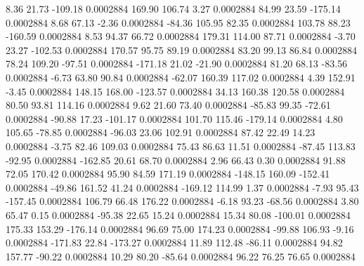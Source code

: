         8.36       21.73     -109.18     0.0002884
      169.90      106.74        3.27     0.0002884
       84.99       23.59     -175.14     0.0002884
        8.68       67.13       -2.36     0.0002884
      -84.36      105.95       82.35     0.0002884
      103.78       88.23     -160.59     0.0002884
        8.53       94.37       66.72     0.0002884
      179.31      114.00       87.71     0.0002884
       -3.70       23.27     -102.53     0.0002884
      170.57       95.75       89.19     0.0002884
       83.20       99.13       86.84     0.0002884
       78.24      109.20      -97.51     0.0002884
     -171.18       21.02      -21.90     0.0002884
       81.20       68.13      -83.56     0.0002884
       -6.73       63.80       90.84     0.0002884
      -62.07      160.39      117.02     0.0002884
        4.39      152.91       -3.45     0.0002884
      148.15      168.00     -123.57     0.0002884
       34.13      160.38      120.58     0.0002884
       80.50       93.81      114.16     0.0002884
        9.62       21.60       73.40     0.0002884
      -85.83       99.35      -72.61     0.0002884
      -90.88       17.23     -101.17     0.0002884
      101.70      115.46     -179.14     0.0002884
        4.80      105.65      -78.85     0.0002884
      -96.03       23.06      102.91     0.0002884
       87.42       22.49       14.23     0.0002884
       -3.75       82.46      109.03     0.0002884
       75.43       86.63       11.51     0.0002884
      -87.45      113.83      -92.95     0.0002884
     -162.85       20.61       68.70     0.0002884
        2.96       66.43        0.30     0.0002884
       91.88       72.05      170.42     0.0002884
       95.90       84.59      171.19     0.0002884
     -148.15      160.09     -152.41     0.0002884
      -49.86      161.52       41.24     0.0002884
     -169.12      114.99        1.37     0.0002884
       -7.93       95.43     -157.45     0.0002884
      106.79       66.48      176.22     0.0002884
       -6.18       93.23      -68.56     0.0002884
        3.80       65.47        0.15     0.0002884
      -95.38       22.65       15.24     0.0002884
       15.34       80.08     -100.01     0.0002884
      175.33      153.29     -176.14     0.0002884
       96.69       75.00      174.23     0.0002884
      -99.88      106.93       -9.16     0.0002884
     -171.83       22.84     -173.27     0.0002884
       11.89      112.48      -86.11     0.0002884
       94.82      157.77      -90.22     0.0002884
       10.29       80.20      -85.64     0.0002884
       96.22       76.25       76.65     0.0002884

